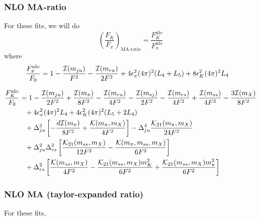 \documentclass[prd,tightenlines,preprintnumbers,showpacs,superscriptaddress,notitlepage,eqsecnum,floatfix,notitlepage]{revtex4-1}
\begin{document}
\subsubsection{NLO MA-ratio}
For these fits, we will do
\begin{equation}
\left(\frac{F_K}{F_\pi}\right)_\text{MA-ratio} = \frac{F_K^\text{nlo}}{F_\pi^\text{nlo}}
\end{equation}
where
\begin{align}
\frac{F_\pi^{\rm nlo}}{F_0} &= 1
- \frac{\mathcal{I}(m_{ju})}{F^2}
-\frac{\mathcal{I}(m_{ru})}{2F^2}
+4 \epsilon_\pi^2 (4\pi)^2 (L_4 + L_5)
+8 \epsilon_K^2 (4\pi)^2 L_4
\end{align}

\begin{align}
\frac{F_K^{\rm nlo}}{F_0} &= 1
-\frac{\mathcal{I}(m_{ju})}{2F^2}
+\frac{\mathcal{I}(m_\pi)}{8F^2}
-\frac{\mathcal{I}(m_{ru})}{4F^2}
-\frac{\mathcal{I}(m_{sj})}{2F^2}
-\frac{\mathcal{I}(m_{rs})}{4F^2}
+\frac{\mathcal{I}(m_{ss})}{4F^2}
-\frac{3\mathcal{I}(m_X)}{8F^2}
\nonumber\\&\phantom{=}
+4\epsilon_\pi^2 (4 \pi)^2 L_4 + 4\epsilon_K^2 (4 \pi)^2  (L_5 + 2L_4)
\nonumber\\&\phantom{=}
+\Delta_{ju}^2 \left[ -\frac{d\mathcal{I}(m_\pi)}{8F^2} + \frac{\mathcal{K(}m_\pi,m_X)}{4F^2} \right]
-\Delta_{ju}^4 \frac{\mathcal{K}_{21}(m_\pi,m_X)}{24 F^2}
\nonumber\\&\phantom{=}
+\Delta_{ju}^2\Delta_{rs}^2 \left[ \frac{\mathcal{K}_{21}(m_{ss},m_X)}{12F^2}
- \frac{\mathcal{K}(m_\pi, m_{ss}, m_X)}{6F^2} \right]
\nonumber\\&\phantom{=}
+\Delta_{rs}^2 \left[
\frac{\mathcal{K}(m_{ss},m_X)}{4F^2}
-\frac{\mathcal{K}_{21}(m_{ss},m_X) m_K^2}{6F^2}
+\frac{\mathcal{K}_{21}(m_{ss},m_X) m_\pi^2}{6F^2}
\right]
\end{align}


\subsubsection{NLO MA (taylor-expanded ratio)}
For these fits,
\end{document}
